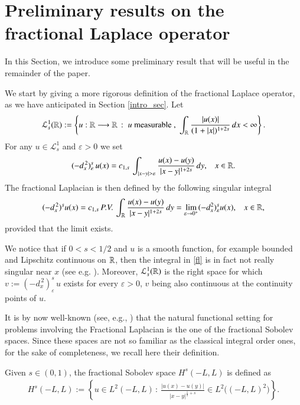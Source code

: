 \section{Preliminary results on the fractional Laplace operator}\label{theor_sec}

In this Section, we introduce some preliminary result that will be useful in the remainder of the paper.


We start by giving a more rigorous definition of the fractional Laplace operator, as we have anticipated in Section \ref{intro_sec}. Let
\begin{align*}
	\mathcal L^1_s(\mathbb{R}) :=\left\{ u:\mathbb{R}\longrightarrow\mathbb{R}\,:\; u\textrm{ measurable },\;\int_{\mathbb{R}}\frac{|u(x)|}{(1+|x|)^{1+2s}}\,dx<\infty\right\}.
\end{align*}
For any $u\in\mathcal L_s^1$ and $\varepsilon>0$ we set 
\begin{align*}
	(-d_x^{\,2})^s_{\varepsilon}\, u(x) = \ccs\,\int_{|x-y|>\varepsilon}\frac{u(x)-u(y)}{|x-y|^{1+2s}}\,dy,\;\;\; x\in\RR.
\end{align*}
The fractional Laplacian is then defined by the following singular integral
\begin{align}\label{fl}
	(-d_x^{\,2})^{s}u(x) = c_{1,s}\,P.V.\,\int_{\mathbb{R}}\frac{u(x)-u(y)}{|x-y|^{1+2s}}\,dy = \lim_{\varepsilon\to 0^+} (-d_x^2)^s_{\varepsilon} u(x), \;\;\; x\in\mathbb{R},
\end{align}
provided that the limit exists. 

We notice that if $0<s<1/2$ and $u$ is a smooth function, for example bounded and Lipschitz continuous on $\mathbb{R}$, then the integral in \eqref{fl} is in fact not really singular near $x$ (see e.g. \cite[Remark 3.1]{dihitchhiker}). Moreover, $\mathcal L_s^1(\mathbb{R})$ is the right space for which $v:= (-d_x^{\,2})^s_{\varepsilon}\, u$ exists for every $\varepsilon > 0$, $v$ being also continuous at the continuity points of $u$.

It is by now well-known (see, e.g., \cite{dihitchhiker}) that the natural functional setting for problems involving the Fractional Laplacian is the one of the fractional Sobolev spaces. Since these spaces are not so familiar as the classical integral order ones, for the sake of completeness, we recall here their definition. 

Given $s\in(0,1)$, the fractional Sobolev space $H^s(-L,L)$ is defined as
\begin{align*}
	H^s(-L,L):= \left\{u\in L^2(-L,L)\,:\, \frac{|u(x)-u(y)|}{|x-y|^{\frac 12+s}}\in L^2\Big((-L,L)^2\Big)\right\}.
\end{align*}

